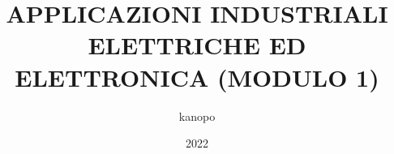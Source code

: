 \documentclass{article}
\begin{document}
    \author{kanopo}
    \title{APPLICAZIONI INDUSTRIALI ELETTRICHE ED ELETTRONICA (MODULO 1)}
    \date{2022}

    \maketitle
    \tableofcontents

    \listoffigures
    \listoftables

    



    
\end{document}
